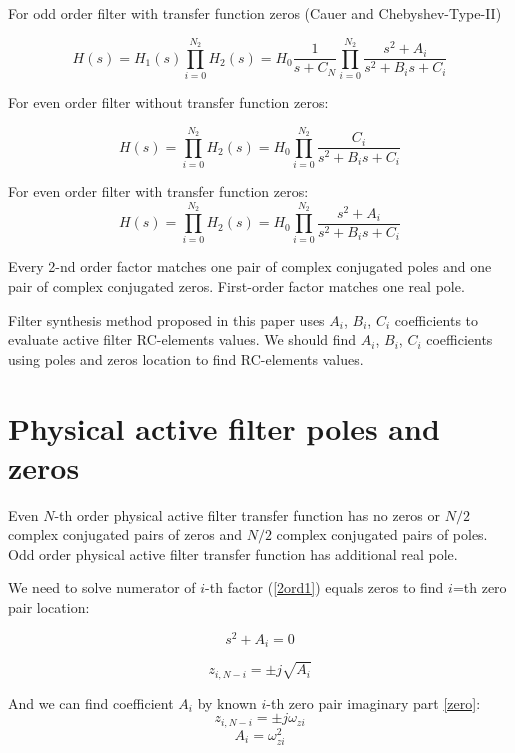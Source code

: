 For odd order filter with transfer function zeros (Cauer and Chebyshev-Type-II)

\begin{equation}
 H(s)=H_1(s)\prod_{i=0}^{N_2}H_2(s) = 
 H_0\frac{1}{s+C_N}\prod_{i=0}^{N_2}\frac{s^2+A_i}{s^2+B_i s+C_i}
\label{trfunc-quad}
\end{equation}

For even order filter without transfer function zeros:

\begin{equation}
 H(s)=\prod_{i=0}^{N_2}H_2(s) = H_0\prod_{i=0}^{N_2}\frac{C_i}{s^2+B_i
s+C_i}
\end{equation}

For even order filter with transfer function zeros:
\begin{equation}
 H(s)=\prod_{i=0}^{N_2}H_2(s) = 
 H_0\prod_{i=0}^{N_2}\frac{s^2+A_i}{s^2+B_i s+C_i}
\end{equation}

Every 2-nd order factor matches one pair of complex conjugated poles and one
pair of complex conjugated zeros. First-order factor matches one real pole.

Filter synthesis method proposed in this paper uses $A_i$, $B_i$, $C_i$
coefficients to evaluate active filter RC-elements values. We should find
$A_i$, $B_i$, $C_i$ coefficients using poles and zeros location to find
RC-elements values.

\section{Physical active filter poles and zeros}

Even $N$-th order physical active filter transfer function has no zeros or $N/2$
complex conjugated pairs of zeros and $N/2$ complex conjugated pairs of poles.
Odd order physical active filter transfer function has additional real pole.

We need to solve numerator of $i$-th factor (\ref{2ord1}) equals zeros to find
$i$=th zero pair location:

\begin{equation}
 s^2+A_i=0
\end{equation}

\begin{equation}
 z_{i,N-i}=\pm j\sqrt{A_i}
\end{equation}

And we can find coefficient $A_i$ by known $i$-th zero pair imaginary part
\ref{zero}:
\begin{equation}
 z_{i,N-i}=\pm j\omega_{zi}
\end{equation}
\begin{equation}
 A_i=\omega_{zi}^2 \label{Ai}
\end{equation}

